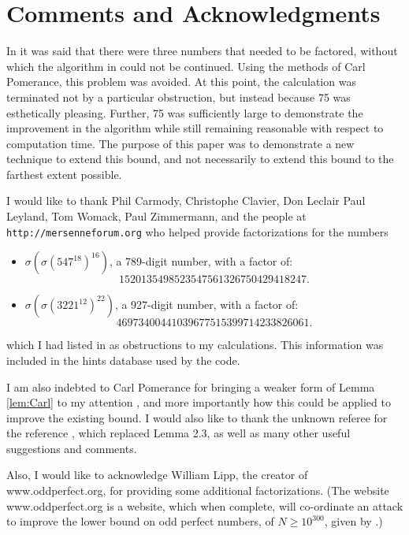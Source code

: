 \documentclass{article}
\begin{document}
\section{Comments and Acknowledgments}

In \cite{Hare05a} it was said that there were three numbers
    that needed to be factored, without which the algorithm in 
    \cite{Hare05a} could not be continued.
Using the methods of Carl Pomerance, this problem was avoided. 
At this point, the calculation was terminated not by a particular
    obstruction, but instead because 75 was esthetically pleasing.
Further, 75 was sufficiently large to demonstrate 
    the improvement in the algorithm while still remaining reasonable 
    with respect to computation time.
The purpose of this paper was to demonstrate a new technique to 
    extend this bound, and not necessarily to extend this bound to the 
    farthest extent possible. 

I would like to thank Phil Carmody, Christophe Clavier, Don Leclair
    Paul Leyland, Tom Womack, Paul Zimmermann, and the people at 
    {\tt http://mersenneforum.org} who helped provide factorizations
    for the numbers 
    \begin{itemize}
      \item $\sigma(\sigma(547^{18})^{16})$,  a 789-digit number,
      with a factor of: \[ 1520135498523547561326750429418247. \] 
      \item $\sigma(\sigma(3221^{12})^{22})$, a 927-digit number,
      with a factor of: \[ 46973400441039677515399714233826061. \]
    \end{itemize}
    which I had listed in \cite{Hare05a} as obstructions to my 
    calculations.
This information was included in the hints database used by the code.

I am also indebted to Carl Pomerance for bringing a weaker form of 
    Lemma \ref{lem:Carl} to my attention \cite{Pomerance74}, 
    and more importantly how this could be applied to 
    improve the existing bound.
I would also like to thank the unknown referee for the reference
    \cite{CohenSorli03}, which replaced Lemma 2.3, as well as many other 
    useful suggestions and comments.

Also, I would like to acknowledge William Lipp, the creator of 
   www.oddperfect.org, for providing some additional factorizations.
(The website www.oddperfect.org is a website, which when complete, will 
    co-ordinate an attack to improve the lower bound on odd perfect numbers,
    of $N \geq 10^{300}$, 
    given by \cite{BrentCohenTeRiele91}.)
\end{document}
